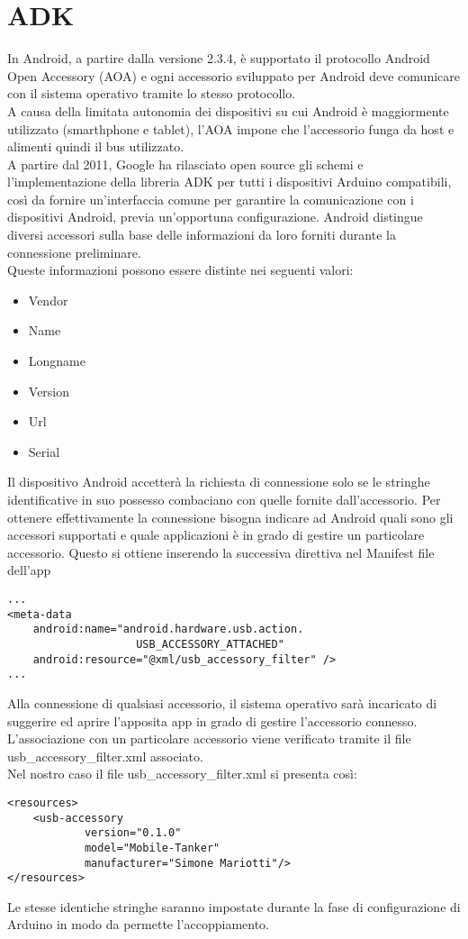 \section {ADK}
In Android, a partire dalla versione 2.3.4, è supportato il protocollo Android Open 
Accessory (AOA) e ogni accessorio sviluppato per Android deve comunicare con il sistema operativo 
tramite lo stesso protocollo. 
\\A causa della limitata autonomia dei dispositivi su cui Android è maggiormente 
utilizzato (smarthphone e tablet), l'AOA impone che l'accessorio funga da host 
e alimenti quindi il bus utilizzato.\cite{aoa}
\\A partire dal 2011, Google ha rilasciato open source gli schemi e l'implementazione 
della libreria ADK per tutti i dispositivi Arduino compatibili, così da fornire 
un'interfaccia comune per garantire la comunicazione con i dispositivi Android, 
previa un'opportuna configurazione. Android distingue diversi accessori 
sulla base delle informazioni da loro forniti durante la connessione preliminare. 
\\Queste informazioni possono essere distinte nei seguenti valori:
\begin{itemize}
\item Vendor
\item Name
\item Longname
\item Version
\item Url
\item Serial
\end{itemize} 
Il dispositivo Android accetterà la richiesta di connessione solo se le stringhe 
identificative in suo possesso combaciano con quelle fornite 
dall'accessorio. Per ottenere effettivamente la connessione bisogna indicare ad 
Android quali sono gli accessori supportati e quale applicazioni è in grado di 
gestire un particolare accessorio. Questo si ottiene inserendo la successiva 
direttiva nel Manifest file dell'app

\lstset{language=XML}

\begin{lstlisting}[caption=Porzione del Manifest file dell'app]
...
<meta-data
    android:name="android.hardware.usb.action.
    				USB_ACCESSORY_ATTACHED"
    android:resource="@xml/usb_accessory_filter" />
...
\end{lstlisting}
Alla connessione di qualsiasi accessorio, il sistema operativo sarà incaricato 
di suggerire ed aprire l'apposita app in grado di gestire l'accessorio connesso. 
L'associazione con un particolare accessorio viene verificato tramite il file 
usb\_accessory\_filter.xml associato.
\\Nel nostro caso il file usb\_accessory\_filter.xml si presenta così:
\begin{lstlisting}[caption=usb\_accessory\_filter.xml]
<resources>
    <usb-accessory
            version="0.1.0"
            model="Mobile-Tanker"
            manufacturer="Simone Mariotti"/>
</resources>
\end{lstlisting}
Le stesse identiche stringhe saranno impostate durante la fase di configurazione 
di Arduino in modo da permette l'accoppiamento.

